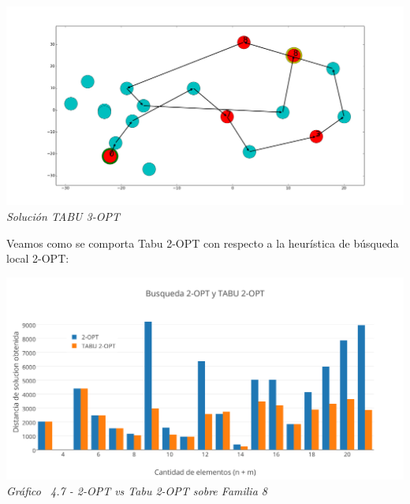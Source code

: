 \vspace*{0.3cm} \vspace*{0.3cm}
  \begin{center}
 \includegraphics[scale=0.3]{./EJ4/fam83opt.png}\\
 {            \textit{Soluci\'on TABU 3-OPT}}
  \end{center}
  \vspace*{0.3cm}

Veamos como se comporta Tabu 2-OPT con respecto a la heur\'istica de b\'usqueda local 2-OPT:

\vspace*{0.3cm} \vspace*{0.3cm}
  \begin{center}
 \includegraphics[scale=0.5]{./EJ4/comparativorandom2opt.png}\\
 {            \textit{Gráfico \ 4.7 - 2-OPT vs Tabu 2-OPT sobre Familia 8}}
  \end{center}
  \vspace*{0.3cm}

